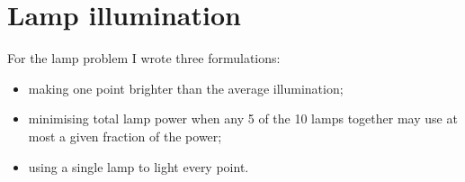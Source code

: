 \section*{Lamp illumination}
For the lamp problem I wrote three formulations:
\begin{itemize}
  \item making one point brighter than the average illumination;
  \item minimising total lamp power when any 5 of the 10 lamps together may use at most a given fraction of the power;
  \item using a single lamp to light every point.
\end{itemize}

